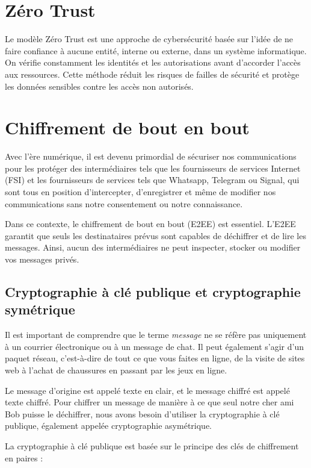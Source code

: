 \section{Zéro Trust}
Le modèle Zéro Trust est une approche de cybersécurité basée sur l'idée de ne faire confiance à aucune entité, interne ou externe, dans un système informatique. On vérifie constamment les identités et les autorisations avant d'accorder l'accès aux ressources. Cette méthode réduit les risques de failles de sécurité et protège les données sensibles contre les accès non autorisés.

\section{Chiffrement de bout en bout}

Avec l'ère numérique, il est devenu primordial de sécuriser nos communications pour les protéger des intermédiaires tels que les fournisseurs de services Internet (FSI) et les fournisseurs de services tels que Whatsapp, Telegram ou Signal, qui sont tous en position d'intercepter, d'enregistrer et même de modifier nos communications sans notre consentement ou notre connaissance.

Dans ce contexte, le chiffrement de bout en bout (E2EE) est essentiel. L'E2EE garantit que seuls les destinataires prévus sont capables de déchiffrer et de lire les messages. Ainsi, aucun des intermédiaires ne peut inspecter, stocker ou modifier vos messages privés.

\subsection{Cryptographie à clé publique et cryptographie symétrique}

Il est important de comprendre que le terme \textit{message} ne se réfère pas uniquement à un courrier électronique ou à un message de chat. Il peut également s'agir d'un paquet réseau, c'est-à-dire de tout ce que vous faites en ligne, de la visite de sites web à l'achat de chaussures en passant par les jeux en ligne.

Le message d'origine est appelé texte en clair, et le message chiffré est appelé texte chiffré. Pour chiffrer un message de manière à ce que seul notre cher ami Bob puisse le déchiffrer, nous avons besoin d'utiliser la cryptographie à clé publique, également appelée cryptographie asymétrique.

La cryptographie à clé publique est basée sur le principe des clés de chiffrement en paires :

